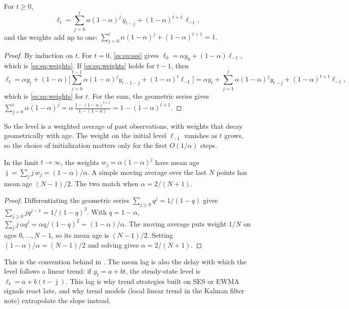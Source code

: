 \begin{proposition}\label{es:prop:weights}
For $t\ge 0$,
\begin{equation}\label{es:eq:weights}
  \ell_t = \sum_{j=0}^{t} \alpha(1-\alpha)^j\, y_{t-j} + (1-\alpha)^{t+1}\,\ell_{-1},
\end{equation}
and the weights add up to one:
$\sum_{j=0}^{t}\alpha(1-\alpha)^j + (1-\alpha)^{t+1} = 1$.
\end{proposition}
\begin{proof}
By induction on $t$. For $t=0$, \eqref{es:eq:ses} gives $\ell_0=\alpha y_0+(1-\alpha)\ell_{-1}$,
which is \eqref{es:eq:weights}. If \eqref{es:eq:weights} holds for $t-1$, then
\[
  \ell_t = \alpha y_t + (1-\alpha)\Big[\sum_{j=0}^{t-1}\alpha(1-\alpha)^j y_{t-1-j} + (1-\alpha)^t\ell_{-1}\Big]
         = \alpha y_t + \sum_{j=1}^{t}\alpha(1-\alpha)^{j} y_{t-j} + (1-\alpha)^{t+1}\ell_{-1},
\]
which is \eqref{es:eq:weights} for $t$. For the sum, the geometric series gives
$\sum_{j=0}^{t}\alpha(1-\alpha)^j = \alpha\,\frac{1-(1-\alpha)^{t+1}}{1-(1-\alpha)} = 1-(1-\alpha)^{t+1}$.
\end{proof}

So the level is a weighted average of past observations, with weights that decay
geometrically with age. The weight on the initial level $\ell_{-1}$ vanishes as $t$ grows, so
the choice of initialization matters only for the first $O(1/\alpha)$ steps.

\begin{proposition}\label{es:prop:lag}
In the limit $t\to\infty$, the weights $w_j=\alpha(1-\alpha)^j$ have mean age
$\bar{\jmath} = \sum_j j\,w_j = (1-\alpha)/\alpha$. A simple moving average over
the last $N$ points has mean age $(N-1)/2$. The two match when
$\alpha = 2/(N+1)$.
\end{proposition}
\begin{proof}
Differentiating the geometric series $\sum_{j\ge0}q^j=1/(1-q)$ gives
$\sum_{j\ge0} j q^{j-1}=1/(1-q)^2$. With $q=1-\alpha$,
$\sum_j j\,\alpha q^j = \alpha q/(1-q)^2 = (1-\alpha)/\alpha$. The moving average
puts weight $1/N$ on ages $0,\dots,N-1$, so its mean age is $(N-1)/2$. Setting
$(1-\alpha)/\alpha=(N-1)/2$ and solving gives $\alpha=2/(N+1)$.
\end{proof}

This is the convention behind  in
. The mean lag is also the delay with which the level
follows a linear trend: if $y_t = a + bt$, the steady-state level is
$\ell_t = a + b(t-\bar{\jmath})$. This lag is why trend strategies built on SES
or EWMA signals react late, and why trend models (local linear trend in the
Kalman filter note) extrapolate the slope instead.

